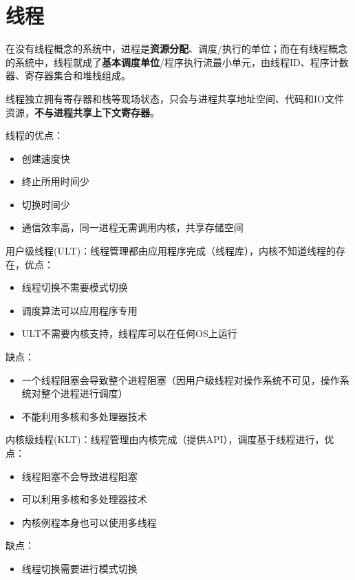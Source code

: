 
\section{线程}
在没有线程概念的系统中，进程是\textbf{资源分配}、调度/执行的单位；而在有线程概念的系统中，线程就成了\textbf{基本调度单位}/程序执行流最小单元，由线程ID、程序计数器、寄存器集合和堆栈组成。

线程独立拥有寄存器和栈等现场状态，只会与进程共享地址空间、代码和IO文件资源，\textbf{不与进程共享上下文寄存器}。

线程的优点：
\begin{itemize}
    \item 创建速度快
    \item 终止所用时间少
    \item 切换时间少
    \item 通信效率高，同一进程无需调用内核，共享存储空间
\end{itemize}

\bigskip
用户级线程(ULT)：线程管理都由应用程序完成（线程库），内核不知道线程的存在，优点：
\begin{itemize}
    \item 线程切换不需要模式切换
    \item 调度算法可以应用程序专用
    \item ULT不需要内核支持，线程库可以在任何OS上运行
\end{itemize}
缺点：
\begin{itemize}
    \item 一个线程阻塞会导致整个进程阻塞（因用户级线程对操作系统不可见，操作系统对整个进程进行调度）
    \item 不能利用多核和多处理器技术
\end{itemize}

\bigskip
内核级线程(KLT)：线程管理由内核完成（提供API），调度基于线程进行，优点：
\begin{itemize}
    \item 线程阻塞不会导致进程阻塞
    \item 可以利用多核和多处理器技术
    \item 内核例程本身也可以使用多线程
\end{itemize}
缺点：
\begin{itemize}
    \item 线程切换需要进行模式切换
\end{itemize}

